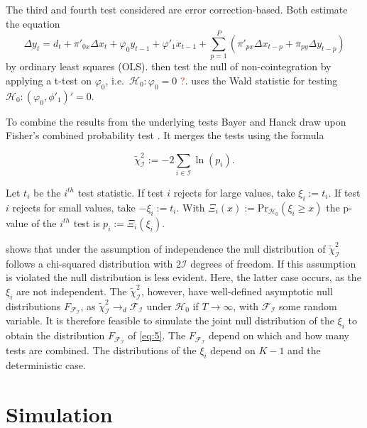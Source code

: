 \documentclass[12pt,a4paper]{article}
\begin{document}
The third and fourth test considered are error correction-based. Both
estimate the equation \begin{equation}
\Delta y_t = d_t + \pi'_{0x} \Delta x_t + \varphi_0 y_{t-1} + \varphi'_1 x_{t-1} + \sum^P_{p=1} (\pi'_{px} \Delta x_{t-p} + \pi_{py} \Delta y_{t-p})
\label{eq:4}
\end{equation} by ordinary least squares (OLS). \textcite{Banerjee_1998}
then test the null of non-cointegration by applying a t-test on
\(\varphi_0\), i.e.~\(\mathcal{H}_0 : \varphi_0 = 0\)
\textcolor{red}{?}. \textcite{Boswijk_1994} uses the Wald statistic for
testing \(\mathcal{H}_0 : (\varphi_0, \phi'_1)' = 0\).

To combine the results from the underlying tests Bayer and Hanck draw
upon Fisher's combined probability test \autocite{Fisher_1932}. It
merges the tests using the formula

\begin{equation}
\tilde{\chi}^2_{\mathcal{I}} := -2 \sum_{i \in \mathcal{I}} \ln{(p_i)}. 
\label{eq:5}
\end{equation}

Let \(t_i\) be the \(i^{th}\) test statistic. If test \(i\) rejects for
large values, take \(\xi_i := t_i\). If test \(i\) rejects for small
values, take \(-\xi_i := t_i\). With
\(\Xi_i(x) := \text{Pr}_{\mathcal{H_0}}(\xi_i \geq x)\) the p-value of
the \(i^{th}\) test is \(p_i := \Xi_i(\xi_i)\).

\textcite{Fisher_1932} shows that under the assumption of independence
the null distribution of \(\tilde{\chi}^2_{\mathcal{I}}\) follows a
chi-squared distribution with \(2\mathcal{I}\) degrees of freedom. If
this assumption is violated the null distribution is less evident. Here,
the latter case occurs, as the \(\xi_i\) are not independent. The
\(\tilde{\chi}^2_{\mathcal{I}}\), however, have well-defined asymptotic
null distributions \(F_{\mathcal{F_I}}\), as
\(\tilde{\chi}^2_{\mathcal{I}} \rightarrow_d \mathcal{F_I}\) under
\(\mathcal{H}_0\) if \(T \rightarrow \infty\), with \(\mathcal{F_I}\)
some random variable. It is therefore feasible to simulate the joint
null distribution of the \(\xi_i\) to obtain the distribution
\(F_{\mathcal{F_I}}\) of \eqref{eq:5}. The \(F_{\mathcal{F_I}}\) depend
on which and how many tests are combined. The distributions of the
\(\xi_i\) depend on \(K-1\) and the deterministic case.

\hypertarget{simulation}{%
\section{Simulation}\label{simulation}}
\end{document}
